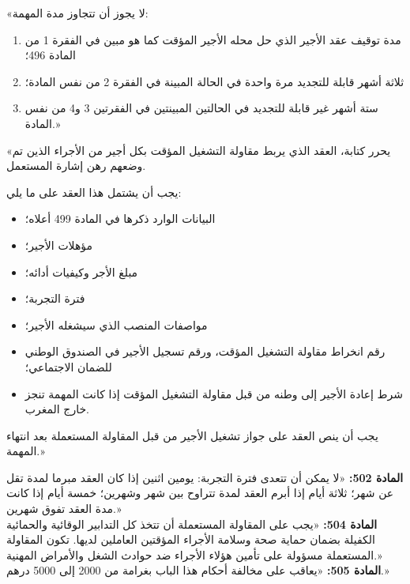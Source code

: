 \begin{tcolorbox}[colback=lightgray, colframe=sectioncolor, arc=3pt, title={\textbf{المادة 500}}]
«لا يجوز أن تتجاوز مدة المهمة:
\begin{enumerate}[itemsep=2pt]
    \item مدة توقيف عقد الأجير الذي حل محله الأجير المؤقت كما هو مبين في الفقرة \textenglish{1} من المادة \textenglish{496}؛
    \item ثلاثة أشهر قابلة للتجديد مرة واحدة في الحالة المبينة في الفقرة \textenglish{2} من نفس المادة؛
    \item ستة أشهر غير قابلة للتجديد في الحالتين المبينتين في الفقرتين \textenglish{3} و\textenglish{4} من نفس المادة.»
\end{enumerate}
\end{tcolorbox}

\begin{tcolorbox}[colback=lightgray, colframe=sectioncolor, arc=3pt, title={\textbf{المادة 501}}]
«يحرر كتابة، العقد الذي يربط مقاولة التشغيل المؤقت بكل أجير من الأجراء الذين تم وضعهم رهن إشارة المستعمل.

يجب أن يشتمل هذا العقد على ما يلي:
\begin{itemize}[itemsep=2pt]
    \item البيانات الوارد ذكرها في المادة \textenglish{499} أعلاه؛
    \item مؤهلات الأجير؛
    \item مبلغ الأجر وكيفيات أدائه؛
    \item فترة التجربة؛
    \item مواصفات المنصب الذي سيشغله الأجير؛
    \item رقم انخراط مقاولة التشغيل المؤقت، ورقم تسجيل الأجير في الصندوق الوطني للضمان الاجتماعي؛
    \item شرط إعادة الأجير إلى وطنه من قبل مقاولة التشغيل المؤقت إذا كانت المهمة تنجز خارج المغرب.
\end{itemize}
يجب أن ينص العقد على جواز تشغيل الأجير من قبل المقاولة المستعملة بعد انتهاء المهمة.»
\end{tcolorbox}

\begin{tcolorbox}[colback=lightgray, colframe=sectioncolor, arc=3pt, title={\textbf{المواد 502 و504 و505}}]
\textbf{المادة \textenglish{502}:} «لا يمكن أن تتعدى فترة التجربة: يومين اثنين إذا كان العقد مبرما لمدة تقل عن شهر؛ ثلاثة أيام إذا أبرم العقد لمدة تتراوح بين شهر وشهرين؛ خمسة أيام إذا كانت مدة العقد تفوق شهرين.»
\vspace{0.2cm}\\
\textbf{المادة \textenglish{504}:} «يجب على المقاولة المستعملة أن تتخذ كل التدابير الوقائية والحمائية الكفيلة بضمان حماية صحة وسلامة الأجراء المؤقتين العاملين لديها. تكون المقاولة المستعملة مسؤولة على تأمين هؤلاء الأجراء ضد حوادث الشغل والأمراض المهنية.»
\vspace{0.2cm}\\
\textbf{المادة \textenglish{505}:} «يعاقب على مخالفة أحكام هذا الباب بغرامة من \textenglish{2000} إلى \textenglish{5000} درهم.»
\end{tcolorbox}


